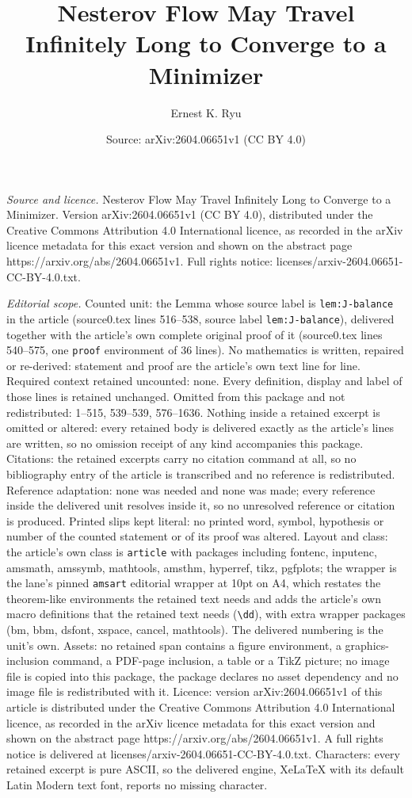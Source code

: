 \documentclass[10pt,a4paper]{amsart}
\title[Nesterov Flow May Travel Infinitely Long to Converge to a Mi]{Nesterov Flow May Travel Infinitely Long to Converge to a Minimizer}
\author{Ernest K. Ryu}
\date{Source: arXiv:2604.06651v1 (CC BY 4.0)}
\begin{document}
\maketitle

\noindent\emph{Source and licence.} Nesterov Flow May Travel Infinitely Long to Converge to a Minimizer. Version arXiv:2604.06651v1 (CC BY 4.0), distributed under the Creative Commons Attribution 4.0 International licence, as recorded in the arXiv licence metadata for this exact version and shown on the abstract page https://arxiv.org/abs/2604.06651v1. Full rights notice: licenses/arxiv-2604.06651-CC-BY-4.0.txt.\par\smallskip

\noindent\textit{Editorial scope.} Counted unit: the Lemma whose source label is \texttt{lem:J-balance} in the article (source0.tex lines 516--538, source label \texttt{lem:J-balance}), delivered together with the article's own complete original proof of it (source0.tex lines 540--575, one \texttt{proof} environment of 36 lines). No mathematics is written, repaired or re-derived: statement and proof are the article's own text line for line. Required context retained uncounted: none. Every definition, display and label of those lines is retained unchanged. Omitted from this package and not redistributed: 1--515, 539--539, 576--1636. Nothing inside a retained excerpt is omitted or altered: every retained body is delivered exactly as the article's lines are written, so no omission receipt of any kind accompanies this package. Citations: the retained excerpts carry no citation command at all, so no bibliography entry of the article is transcribed and no reference is redistributed. Reference adaptation: none was needed and none was made; every reference inside the delivered unit resolves inside it, so no unresolved reference or citation is produced. Printed slips kept literal: no printed word, symbol, hypothesis or number of the counted statement or of its proof was altered. Layout and class: the article's own class is \texttt{article} with packages including fontenc, inputenc, amsmath, amssymb, mathtools, amsthm, hyperref, tikz, pgfplots; the wrapper is the lane's pinned \texttt{amsart} editorial wrapper at 10pt on A4, which restates the theorem-like environments the retained text needs and adds the article's own macro definitions that the retained text needs (\texttt{\textbackslash dd}), with extra wrapper packages (bm, bbm, dsfont, xspace, cancel, mathtools). The delivered numbering is the unit's own. Assets: no retained span contains a figure environment, a graphics-inclusion command, a PDF-page inclusion, a table or a TikZ picture; no image file is copied into this package, the package declares no asset dependency and no image file is redistributed with it. Licence: version arXiv:2604.06651v1 of this article is distributed under the Creative Commons Attribution 4.0 International licence, as recorded in the arXiv licence metadata for this exact version and shown on the abstract page https://arxiv.org/abs/2604.06651v1. A full rights notice is delivered at licenses/arxiv-2604.06651-CC-BY-4.0.txt. Characters: every retained excerpt is pure ASCII, so the delivered engine, XeLaTeX with its default Latin Modern text font, reports no missing character.
\end{document}
